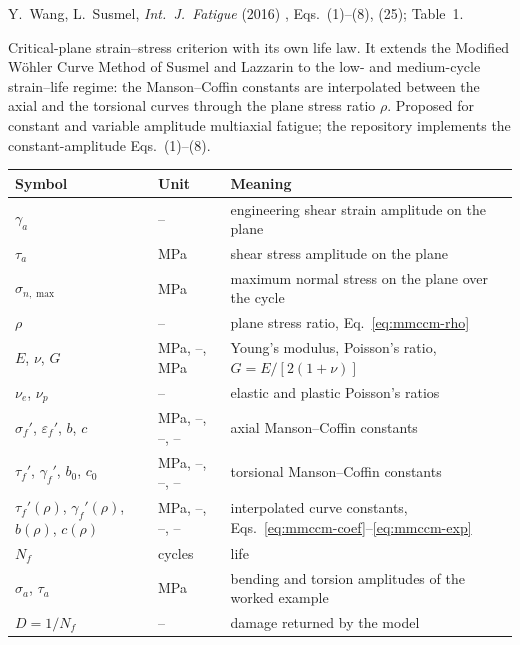 \label{sheet:MMCCM}

 Y.~Wang, L.~Susmel, \emph{Int.\ J.\ Fatigue} (2016) \cite{wang2016},
Eqs.~(1)--(8), (25); Table~1.

 Critical-plane strain--stress criterion with its own life law. It extends
the Modified W\"ohler Curve Method of Susmel and Lazzarin to the low- and medium-cycle strain--life
regime: the Manson--Coffin constants are interpolated between the axial and the torsional curves
through the plane stress ratio $\rho$. Proposed for constant and variable amplitude multiaxial
fatigue; the repository implements the constant-amplitude Eqs.~(1)--(8).

\begin{center}\small
\begin{tabular}{@{}llp{100mm}@{}}
\toprule
Symbol & Unit & Meaning\\\midrule
$\gamma_a$ & -- & engineering shear strain amplitude on the plane\\
$\tau_a$ & MPa & shear stress amplitude on the plane\\
$\sigma_{n,\max}$ & MPa & maximum normal stress on the plane over the cycle\\
$\rho$ & -- & plane stress ratio, Eq.~\eqref{eq:mmccm-rho}\\
$E$, $\nu$, $G$ & MPa, --, MPa & Young's modulus, Poisson's ratio, $G=E/[2(1+\nu)]$\\
$\nu_e$, $\nu_p$ & -- & elastic and plastic Poisson's ratios\\
$\sigma_f'$, $\varepsilon_f'$, $b$, $c$ & MPa, --, --, -- & axial Manson--Coffin constants\\
$\tau_f'$, $\gamma_f'$, $b_0$, $c_0$ & MPa, --, --, -- & torsional Manson--Coffin constants\\
$\tau_f'(\rho)$, $\gamma_f'(\rho)$, $b(\rho)$, $c(\rho)$ & MPa, --, --, -- & interpolated curve constants, Eqs.~\eqref{eq:mmccm-coef}--\eqref{eq:mmccm-exp}\\
$N_f$ & cycles & life\\
$\sigma_a$, $\tau_a$ & MPa & bending and torsion amplitudes of the worked example\\
$D=1/N_f$ & -- & damage returned by the model\\
\bottomrule
\end{tabular}
\end{center}

